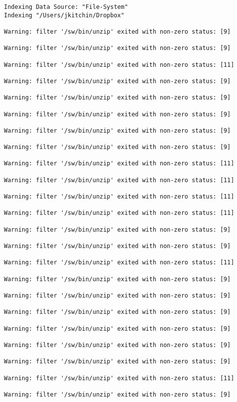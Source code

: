 \documentclass[11pt]{article}
\begin{document}
\begin{verbatim}
Indexing Data Source: "File-System"
Indexing "/Users/jkitchin/Dropbox"

Warning: filter '/sw/bin/unzip' exited with non-zero status: [9]

Warning: filter '/sw/bin/unzip' exited with non-zero status: [9]

Warning: filter '/sw/bin/unzip' exited with non-zero status: [11]

Warning: filter '/sw/bin/unzip' exited with non-zero status: [9]

Warning: filter '/sw/bin/unzip' exited with non-zero status: [9]

Warning: filter '/sw/bin/unzip' exited with non-zero status: [9]

Warning: filter '/sw/bin/unzip' exited with non-zero status: [9]

Warning: filter '/sw/bin/unzip' exited with non-zero status: [9]

Warning: filter '/sw/bin/unzip' exited with non-zero status: [11]

Warning: filter '/sw/bin/unzip' exited with non-zero status: [11]

Warning: filter '/sw/bin/unzip' exited with non-zero status: [11]

Warning: filter '/sw/bin/unzip' exited with non-zero status: [11]

Warning: filter '/sw/bin/unzip' exited with non-zero status: [9]

Warning: filter '/sw/bin/unzip' exited with non-zero status: [9]

Warning: filter '/sw/bin/unzip' exited with non-zero status: [11]

Warning: filter '/sw/bin/unzip' exited with non-zero status: [9]

Warning: filter '/sw/bin/unzip' exited with non-zero status: [9]

Warning: filter '/sw/bin/unzip' exited with non-zero status: [9]

Warning: filter '/sw/bin/unzip' exited with non-zero status: [9]

Warning: filter '/sw/bin/unzip' exited with non-zero status: [9]

Warning: filter '/sw/bin/unzip' exited with non-zero status: [9]

Warning: filter '/sw/bin/unzip' exited with non-zero status: [11]

Warning: filter '/sw/bin/unzip' exited with non-zero status: [9]


\end{verbatim}
\end{document}
